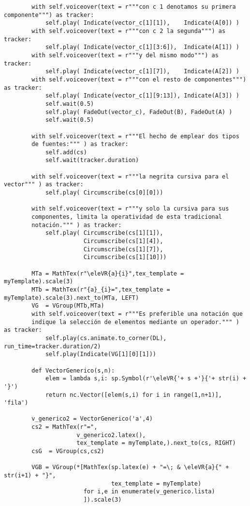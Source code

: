\documentclass[11pt]{article}
\begin{document}
\begin{verbatim}
        with self.voiceover(text = r"""con c 1 denotamos su primera componente""") as tracker:
            self.play( Indicate(vector_c[1][1]),    Indicate(A[0]) )
        with self.voiceover(text = r"""con c 2 la segunda""") as tracker:
            self.play( Indicate(vector_c[1][3:6]),  Indicate(A[1]) )
        with self.voiceover(text = r"""y del mismo modo""") as tracker:
            self.play( Indicate(vector_c[1][7]),    Indicate(A[2]) )
        with self.voiceover(text = r"""con el resto de componentes""") as tracker:
            self.play( Indicate(vector_c[1][9:13]), Indicate(A[3]) )
            self.wait(0.5)
            self.play( FadeOut(vector_c), FadeOut(B), FadeOut(A) )
            self.wait(0.5)

        with self.voiceover(text = r"""El hecho de emplear dos tipos
        de fuentes:""" ) as tracker:
            self.add(cs)
            self.wait(tracker.duration)
            
        with self.voiceover(text = r"""la negrita cursiva para el vector""" ) as tracker:
            self.play( Circumscribe(cs[0][0]))
            
        with self.voiceover(text = r"""y solo la cursiva para sus
        componentes, limita la operatividad de esta tradicional
        notación.""" ) as tracker:
            self.play( Circumscribe(cs[1][1]),
                       Circumscribe(cs[1][4]),
                       Circumscribe(cs[1][7]),
                       Circumscribe(cs[1][10]))

        MTa = MathTex(r"\eleVR{a}{i}",tex_template = myTemplate).scale(3)
        MTb = MathTex(r"{a}_{i}=",tex_template = myTemplate).scale(3).next_to(MTa, LEFT)
        VG  = VGroup(MTb,MTa) 
        with self.voiceover(text = r"""Es preferible una notación que
        indique la selección de elementos mediante un operador.""" ) as tracker:
            self.play(cs.animate.to_corner(DL), run_time=tracker.duration/2)
            self.play(Indicate(VG[1][0][1]))

        def VectorGenerico(s,n):
            elem = lambda s,i: sp.Symbol(r'\eleVR{'+ s +'}{'+ str(i) + '}')
            return nc.Vector([elem(s,i) for i in range(1,n+1)], 'fila')
        
        v_generico2 = VectorGenerico('a',4)
        cs2 = MathTex(r"=",
                     v_generico2.latex(),
                     tex_template = myTemplate,).next_to(cs, RIGHT)
        csG  = VGroup(cs,cs2) 
        
        VGB = VGroup(*[MathTex(sp.latex(e) + "=\; & \eleVR{a}{" + str(i+1) + "}",
                               tex_template = myTemplate)
                       for i,e in enumerate(v_generico.lista)
                       ]).scale(3)
        

\end{verbatim}
\end{document}
